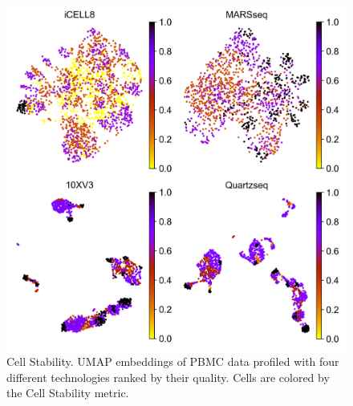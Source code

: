 \documentclass[11pt, titlepage, twoside]{article}
\begin{document}
\begin{figure}[htbp]
\centering
\includegraphics[keepaspectratio,width=\textwidth,width=0.50\textheight]{Figure_Stability.png}
\caption[]{Cell Stability. UMAP embeddings of PBMC data profiled with four different technologies ranked by their quality. Cells are colored by the Cell Stability metric.}\label{Figure_Stability}
\end{figure}
\clearpage

\end{document}
